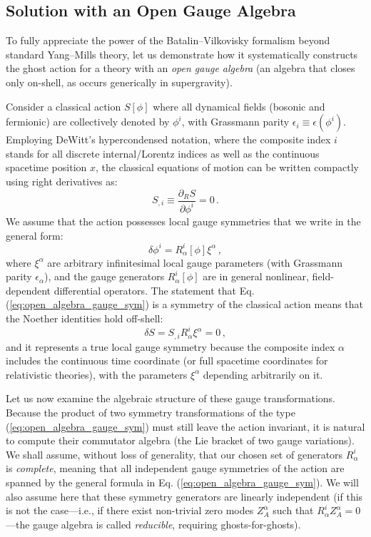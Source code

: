 \subsection{Solution with an Open Gauge Algebra}

To fully appreciate the power of the Batalin--Vilkovisky formalism beyond standard Yang--Mills theory, let us demonstrate how it systematically constructs the ghost action for a theory with an \textit{open gauge algebra} (an algebra that closes only on-shell, as occurs generically in supergravity).

Consider a classical action \(S[\phi]\) where all dynamical fields (bosonic and fermionic) are collectively denoted by \(\phi^i\), with Grassmann parity \(\epsilon_i \equiv \epsilon(\phi^i)\). Employing DeWitt's hypercondensed notation, where the composite index \(i\) stands for all discrete internal/Lorentz indices as well as the continuous spacetime position \(x\), the classical equations of motion can be written compactly using right derivatives as:
\begin{equation} \label{eq:open_algebra_eom}
    S_{,i} \equiv \frac{\partial_R S}{\partial \phi^i} = 0 \, .
\end{equation}
We assume that the action possesses local gauge symmetries that we write in the general form:
\begin{equation} \label{eq:open_algebra_gauge_sym}
    \delta \phi^i = R^i_\alpha[\phi] \xi^\alpha \, ,
\end{equation}
where \(\xi^\alpha\) are arbitrary infinitesimal local gauge parameters (with Grassmann parity \(\epsilon_\alpha\)), and the gauge generators \(R^i_\alpha[\phi]\) are in general nonlinear, field-dependent differential operators. The statement that Eq. (\ref{eq:open_algebra_gauge_sym}) is a symmetry of the classical action means that the Noether identities hold off-shell:
\begin{equation} \label{eq:noether_identity_general}
    \delta S = S_{,i} R^i_\alpha \xi^\alpha = 0 \, ,
\end{equation}
and it represents a true local gauge symmetry because the composite index \(\alpha\) includes the continuous time coordinate (or full spacetime coordinates for relativistic theories), with the parameters \(\xi^\alpha\) depending arbitrarily on it.

Let us now examine the algebraic structure of these gauge transformations. Because the product of two symmetry transformations of the type (\ref{eq:open_algebra_gauge_sym}) must still leave the action invariant, it is natural to compute their commutator algebra (the Lie bracket of two gauge variations). We shall assume, without loss of generality, that our chosen set of generators \(R^i_\alpha\) is \textit{complete}, meaning that all independent gauge symmetries of the action are spanned by the general formula in Eq. (\ref{eq:open_algebra_gauge_sym}). We will also assume here that these symmetry generators are linearly independent (if this is not the case—i.e., if there exist non-trivial zero modes \(Z^\alpha_A\) such that \(R^i_\alpha Z^\alpha_A = 0\)—the gauge algebra is called \textit{reducible}, requiring ghosts-for-ghosts).

